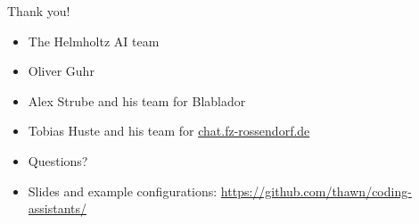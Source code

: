 \documentclass[
  aspectratio=1610,
]{beamer}
\begin{document}
\begin{frame}{Thank you!}
  \begin{itemize}
    \item The Helmholtz AI team
    \item Oliver Guhr
    \item Alex Strube and his team for Blablador
    \item Tobias Huste and his team for \href{https://chat.fz-rossendorf.de}{chat.fz-rossendorf.de}
    \item Questions?
    \item Slides and example configurations: \href{https://github.com/thawn/coding-assistants/}{https://github.com/thawn/coding-assistants/}
  \end{itemize}

\end{frame}
\end{document}
